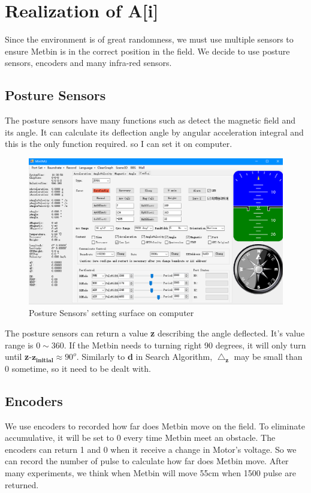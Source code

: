 \documentclass[12pt]{article}
\begin{document}
\section{Realization of \textbf{A[i]}} 
Since the environment is of great randomness, we must use multiple sensors to ensure Metbin is in the correct position in the field. We decide to use posture sensors, encoders and many infra-red sensors.
\subsection{Posture Sensors}
The posture sensors have many functions such as detect the magnetic field and its angle. It can calculate its deflection angle by angular acceleration integral and this is the only function required. so I can set it on computer.
\begin{figure}[H]
\centering
\includegraphics[scale=0.5]{P7.jpg}
\caption{Posture Sensors' setting surface on computer}
\end{figure}
The posture sensors can return a value \textbf{z} describing the angle deflected. It's value range is $0\sim360$. If the Metbin needs to turning right 90 degrees, it will only turn until \textbf{z}-\textbf{$\mathbf{z_{initial}}$}$\approx90^o$. Similarly to \textbf{d} in Search Algorithm, $\mathbf{\bigtriangleup_z}$ may be small than 0 sometime, so it need to be dealt with. 
\subsection{Encoders}
We use encoders to recorded how far does Metbin move on the field. To eliminate accumulative, it will be set to 0 every time Metbin meet an obstacle. The encoders can return 1 and 0 when it receive a change in Motor's voltage. So we can record the number of pulse to calculate how far does Metbin move. After many experiments, we think when Metbin will move 55cm when 1500 pulse are returned.
\end{document}
